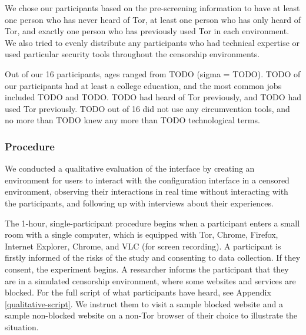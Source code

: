 \documentclass{template}
\begin{document}
We chose our participants based on the pre-screening information to have 
at least one person who has never heard of Tor, at least one person who has 
only heard of Tor, and exactly one person who has previously used Tor in each
environment. We also tried to evenly distribute any participants who had technical
expertise or used particular security tools throughout the censorship environments. 

Out of our 16 participants, ages ranged from {\color {red} TODO}
(sigma = {\color {red} TODO}). {\color {red} TODO} of our participants had at least
a college education, and the most common jobs included {\color {red} TODO} and
{\color {red} TODO}. {\color {red} TODO} had heard of Tor previously, 
and {\color {red} TODO} had used Tor previously. {\color {red} TODO} out of 
16 did not use any circumvention tools, and no more than {\color {red} TODO} 
knew any more than {\color {red} TODO} technological terms.


\subsubsection{Procedure}
We conducted a qualitative evaluation of the interface by creating an environment 
for users to interact with the configuration interface in a censored environment, 
observing their interactions in real time without interacting with the participants, 
and following up with interviews about their experiences.

The 1-hour, single-participant procedure begins when a participant enters a small 
room with a single computer, which is equipped with Tor, Chrome, Firefox, Internet Explorer, 
Chrome, and VLC (for screen recording). A participant is firstly informed of 
the risks of the study and consenting to data collection. If they consent, the 
experiment begins. A researcher informs the participant that they are in a
simulated censorship environment, where some websites and services are blocked. 
For the full script of what participants have heard, see Appendix \ref{qualitative-script}. We
instruct them to visit a sample blocked website and a sample non-blocked website on a
non-Tor browser of their choice to illustrate the situation.
\end{document}
